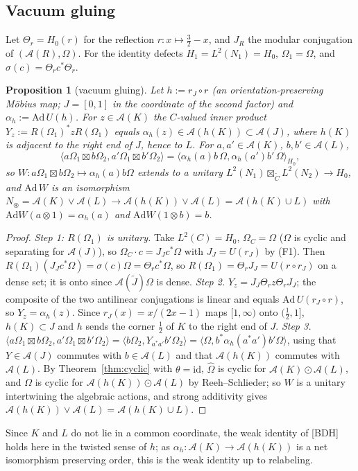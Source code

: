 \documentclass[11pt]{article}
\newtheorem{proposition}[theorem]{Proposition}
\theoremstyle{definition}
\theoremstyle{remark}
\newcommand{\cA}{\mathcal A}
\newcommand{\Om}{\Omega}
\newcommand{\fus}{\boxtimes}
\newcommand{\ip}[2]{\langle #1,#2\rangle}
\begin{document}
\subsection{Vacuum gluing}
Let $\Theta_r=H_0(r)$ for the reflection $r\colon x\mapsto\tfrac32-x$, and $J_R$ the modular conjugation of $(\cA(R),\Om)$. For the identity defects $H_1=L^2(N_1)=H_0$, $\Om_1=\Om$, and $\sigma(c)=\Theta_rc^*\Theta_r$.

\begin{proposition}[vacuum gluing]\label{prop:W}
Let $h:=r_J\circ r$ (an orientation-preserving M\"obius map; $J=[0,1]$ in the coordinate of the second factor) and $\alpha_h:=\mathrm{Ad}\,U(h)$. For $z\in\cA(K)$ the $C$-valued inner product $Y_z:=R(\Om_1)^*zR(\Om_1)$ equals $\alpha_h(z)\in\cA(h(K))\subset\cA(J)$, where $h(K)$ is adjacent to the right end of $J$, hence to $L$. For $a,a'\in\cA(K)$, $b,b'\in\cA(L)$,
\[
\ip{a\Om_1\fus b\Om_2}{a'\Om_1\fus b'\Om_2}=\ip{\alpha_h(a)b\,\Om}{\alpha_h(a')b'\,\Om}_{H_0},
\]
so $W\colon a\Om_1\fus b\Om_2\mapsto\alpha_h(a)b\Om$ extends to a unitary $L^2(N_1)\fus_{\tilde C}L^2(N_2)\to H_0$, and $\mathrm{Ad}\,W$ is an isomorphism $N_\circledast=\cA(K)\vee\cA(L)\to\cA(h(K))\vee\cA(L)=\cA(h(K)\cup L)$ with $\mathrm{Ad}W(a\otimes1)=\alpha_h(a)$ and $\mathrm{Ad}W(1\otimes b)=b$.
\end{proposition}
\begin{proof}
\emph{Step 1: $R(\Om_1)$ is unitary.} Take $L^2(C)=H_0$, $\Om_C=\Om$ ($\Om$ is cyclic and separating for $\cA(J)$), so $\Om_C\cdot c=J_Jc^*\Om$ with $J_J=U(r_J)$ by (F1). Then $R(\Om_1)(J_Jc^*\Om)=\sigma(c)\Om=\Theta_rc^*\Om$, so $R(\Om_1)=\Theta_rJ_J=U(r\circ r_J)$ on a dense set; it is onto since $\cA(\tilde J)\Om$ is dense.
\emph{Step 2.} $Y_z=J_J\Theta_rz\Theta_rJ_J$; the composite of the two antilinear conjugations is linear and equals $\mathrm{Ad}\,U(r_J\circ r)$, so $Y_z=\alpha_h(z)$. Since $r_J(x)=x/(2x-1)$ maps $[1,\infty)$ onto $(\tfrac12,1]$, $h(K)\subset J$ and $h$ sends the corner $\tfrac12$ of $K$ to the right end of $J$.
\emph{Step 3.} $\ip{a\Om_1\fus b\Om_2}{a'\Om_1\fus b'\Om_2}=\ip{b\Om_2}{Y_{a^*a'}b'\Om_2}=\ip{\Om}{b^*\alpha_h(a^*a')b'\Om}$, using that $Y\in\cA(J)$ commutes with $b\in\cA(L)$ and that $\cA(h(K))$ commutes with $\cA(L)$. By Theorem~\ref{thm:cyclic} with $\theta=\mathrm{id}$, $\hat\Om$ is cyclic for $\cA(K)\odot\cA(L)$, and $\Om$ is cyclic for $\cA(h(K))\odot\cA(L)$ by Reeh--Schlieder; so $W$ is a unitary intertwining the algebraic actions, and strong additivity gives $\cA(h(K))\vee\cA(L)=\cA(h(K)\cup L)$.
\end{proof}
Since $K$ and $L$ do not lie in a common coordinate, the weak identity of [BDH] holds here in the twisted sense of $h$; as $\alpha_h\colon\cA(K)\to\cA(h(K))$ is a net isomorphism preserving order, this is the weak identity up to relabeling.
\end{document}
